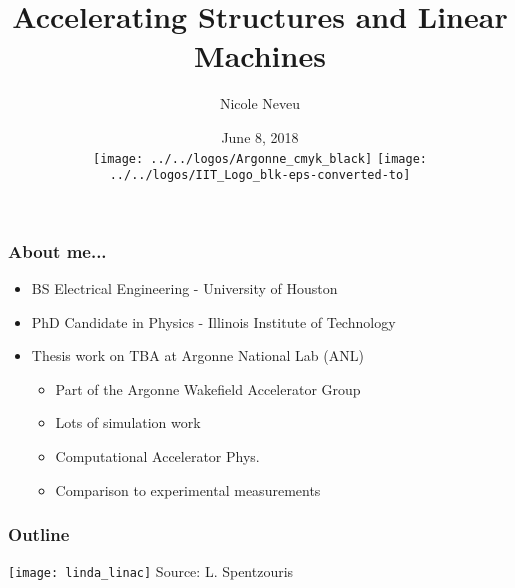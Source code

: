 \documentclass[professionalfonts,t]{beamer}
\title[USPAS Fundamentals, June 4-15, 2018]{Accelerating Structures and Linear Machines}
\author[N.Neveu]{{\Large Nicole Neveu}}
\institute[ANL, IIT] %
{   Illinois Institute of Technology \\
	Argonne National Laboratory \\
    \url{nneveu@anl.gov} 
}
\date{ June 8, 2018 \\ \vspace{0.5em}
\texttt{[image: ../../logos/Argonne\_cmyk\_black]}%
\hfill \hfill \hfill%
\texttt{[image: ../../logos/IIT\_Logo\_blk-eps-converted-to]}%
}
\begin{document}
\begin{frame}
  \titlepage
\end{frame}
\begin{frame}
	\frametitle{About me...}
	\begin{itemize}
		\item BS Electrical Engineering - University of Houston 
		\item PhD Candidate in Physics - Illinois Institute of Technology
		\item Thesis work on TBA at Argonne National Lab (ANL)
		\begin{itemize}
			\item Part of the Argonne Wakefield Accelerator Group
			\item Lots of simulation work
			\item Computational Accelerator Phys.
			\item Comparison to experimental measurements
		\end{itemize}
	\end{itemize}
\end{frame}


\begin{frame}
	\frametitle{Outline}
	\begin{minipage}{0.4\textwidth}
		\tableofcontents
	\end{minipage}\hfill
\begin{minipage}{0.5\textwidth}
	\centering
	\texttt{[image: linda\_linac]}
	Source: L. Spentzouris
\end{minipage}
\end{frame}





\end{document}
